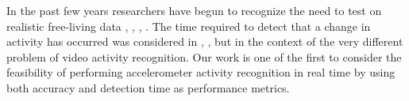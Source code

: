 In the past few years researchers have begun to recognize the need to test on
realistic free-living data \cite{gu09}, \cite{kwapitz10}, \cite{strohrmann11},
\cite{wu09}. The time required to detect that a change in activity has occurred
was considered in \cite{grauman12}, \cite{song06}, but in the context of
the very different problem of video activity recognition. Our work is one of the
first to consider the feasibility of performing accelerometer activity
recognition in real time by using both accuracy and detection time as
performance metrics.
